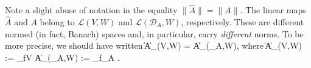 \br
Note a slight abuse of notation in the equality $\|\widehat A\|=\|A\|$. The linear maps $\widehat A$ and $A$ belong to $\mathcal{L}(V,W)$ and $\mathcal{L}(\mathcal{D}_A,W)$, respectively. These are different normed (in fact, Banach) spaces and, in particular, carry \emph{different} norms. To be more precise, we should have written
\bse
\|\widehat A\|_{(V,W)} = \|A\|_{(_A,W)},
\ese
where 
\bse
\|\widehat A\|_{(V,W)} := \sup_{f\in V}  \qquad {}\qquad
\| A\|_{(_A,W)} := \sup_{f\in {}_A} .
\ese
\er





















